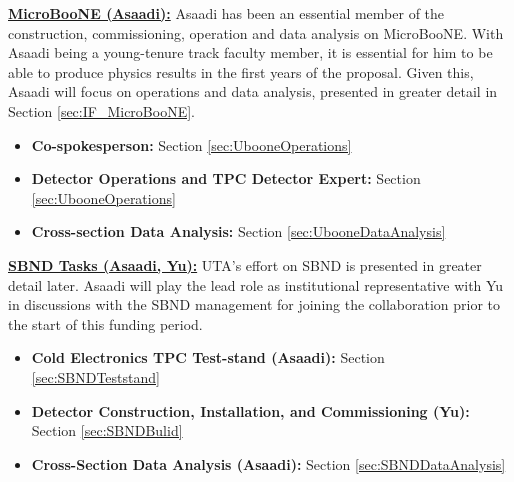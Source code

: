 

\noindent \underline{\textbf{MicroBooNE (Asaadi):}} Asaadi has been an essential member of the construction, commissioning, operation and data analysis on MicroBooNE. With Asaadi being a young-tenure track faculty member, it is essential for him to be able to produce physics results in the first years of the proposal. Given this, Asaadi will focus on operations and data analysis, presented in greater detail in Section \ref{sec:IF_MicroBooNE}.
\begin{itemize}
\item{\textbf{Co-spokesperson:}} Section \ref{sec:UbooneOperations}
\item{\textbf{Detector Operations and TPC Detector Expert:}} Section \ref{sec:UbooneOperations}
\item{\textbf{Cross-section Data Analysis:}} Section \ref{sec:UbooneDataAnalysis}
\end{itemize}

\noindent \underline{\textbf{SBND Tasks (Asaadi, Yu):}}  UTA's effort on SBND is presented in greater detail later. Asaadi will play the lead role as institutional representative with Yu in discussions with the SBND management for joining the collaboration prior to the start of this funding period.
\begin{itemize}
\item{\textbf{Cold Electronics TPC Test-stand (Asaadi):}} Section \ref{sec:SBNDTeststand}
\item{\textbf{Detector Construction, Installation, and Commissioning (Yu):}} Section \ref{sec:SBNDBulid}
\item{\textbf{Cross-Section Data Analysis (Asaadi):}} Section \ref{sec:SBNDDataAnalysis}
\end{itemize}

